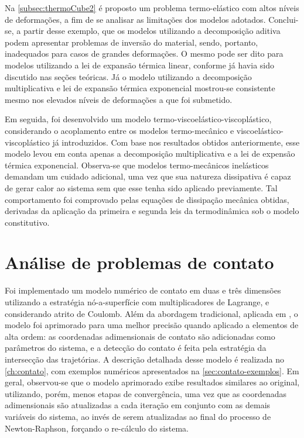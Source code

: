 \documentclass[Relatorio-FAPESP-2020.tex]{subfiles}
\begin{document}
Na \autoref{subsec:thermoCube2} é proposto um problema termo-elástico com altos níveis de deformações, a fim de se analisar as limitações dos modelos adotados. Conclui-se, a partir desse exemplo, que os modelos utilizando a decomposição aditiva podem apresentar problemas de inversão do material, sendo, portanto, inadequados para casos de grandes deformações. O mesmo pode ser dito para modelos utilizando a lei de expansão térmica linear, conforme já havia sido discutido nas seções teóricas. Já o modelo utilizando a decomposição multiplicativa e lei de expansão térmica exponencial mostrou-se consistente mesmo nos elevados níveis de deformações a que foi submetido.

Em seguida, foi desenvolvido um modelo termo-viscoelástico-viscoplástico, considerando o acoplamento entre os modelos termo-mecânico e viscoelástico-viscoplástico já introduzidos. Com base nos resultados obtidos anteriormente, esse modelo levou em conta apenas a decomposição multiplicativa e a lei de expensão térmica exponencial. Observa-se que modelos termo-mecânicos inelásticos demandam um cuidado adicional, uma vez que sua natureza dissipativa é capaz de gerar calor ao sistema sem que esse tenha sido aplicado previamente. Tal comportamento foi comprovado pelas equações de dissipação mecânica obtidas, derivadas da aplicação da primeira e segunda leis da termodinâmica sob o modelo constitutivo. 

\section{Análise de problemas de contato}

Foi implementado um modelo numérico de contato em duas e três dimensões utilizando a estratégia nó-a-superfície com multiplicadores de Lagrange, e considerando atrito de Coulomb. Além da abordagem tradicional, aplicada em , o modelo foi aprimorado para uma melhor precisão quando aplicado a elementos de alta ordem: as coordenadas adimensionais de contato são adicionadas como parâmetros do sistema, e a detecção do contato é feita pela estratégia da intersecção das trajetórias. A descrição detalhada desse modelo é realizada no \autoref{ch:contato}, com exemplos numéricos apresentados na \autoref{sec:contato-exemplos}. Em geral, observou-se que o modelo aprimorado exibe resultados similares ao original, utilizando, porém, menos etapas de convergência, uma vez que as coordenadas adimensionais são atualizadas a cada iteração em conjunto com as demais variáveis do sistema, ao invés de serem atualizadas ao final do processo de Newton-Raphson, forçando o re-cálculo do sistema.
\end{document}
